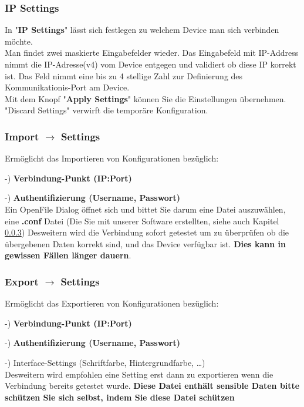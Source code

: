 \documentclass[11pt]{article} %
\begin{document}
\subsubsection{IP Settings}
In "\textbf{IP Settings}" lässt sich festlegen zu welchem Device man sich verbinden möchte.\\
Man findet zwei maskierte Eingabefelder wieder. Das Eingabefeld mit IP-Address nimmt die IP-Adresse(v4) vom Device entgegen und validiert ob diese IP korrekt ist. Das Feld nimmt eine bis zu 4 stellige Zahl zur Definierung des Kommunikationis-Port am Device.\\
Mit dem Knopf "\textbf{Apply Settings}" können Sie die Einstellungen übernehmen. "Discard Settings" verwirft die temporäre Konfiguration.\\
\color{black}
\subsubsection{Import $\rightarrow$ Settings}
\label{sec:FFIS}
Ermöglicht das Importieren von Konfigurationen bezüglich: 

-) \textbf{Verbindung-Punkt (IP:Port)}

-) \textbf{Authentifizierung (Username, Passwort)}\\
Ein OpenFile Dialog öffnet sich und bittet Sie darum eine Datei auszuwählen, eine \textbf{.conf} Datei (Die Sie mit unserer Software erstellten, siehe auch Kapitel \ref{sec:FFES})
Desweitern wird die Verbindung sofort getestet um zu überprüfen ob die übergebenen Daten korrekt sind, und das Device verfügbar ist.
\textbf{Dies kann in gewissen Fällen länger dauern}.\\
\subsubsection{Export $\rightarrow$ Settings}
\label{sec:FFES}
Ermöglicht das Exportieren von Konfigurationen bezüglich: 

-) \textbf{Verbindung-Punkt (IP:Port)}

-) \textbf{Authentifizierung (Username, Passwort)}

-) Interface-Settings (Schriftfarbe, Hintergrundfarbe, \dots )\\
Desweitern wird empfohlen eine Setting erst dann zu exportieren wenn die Verbindung bereits getestet wurde.
\textbf{Diese Datei enthält sensible Daten bitte schützen Sie sich selbst, indem Sie diese Datei schützen}\\
\end{document}
